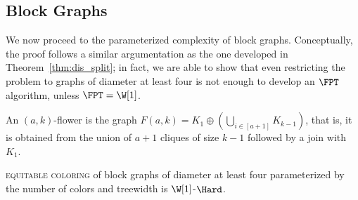 \subsection{Block Graphs}

We now proceed to the parameterized complexity of block graphs.
Conceptually, the proof follows a similar argumentation as the one developed in Theorem~\ref{thm:dis_split}; in fact, we are able to show that even restricting the problem to graphs of diameter at least four is not enough to develop an $\FPT$ algorithm, unless $\FPT = \W[1]$.
 
\begin{definition}
    An $(a,k)$-flower is the graph $F(a,k) = K_1 \oplus \left(\bigcup_{i \in [a+1]} K_{k-1}\right)$, that is, it is obtained from the union of $a+1$ cliques of size $k-1$ followed by a join with $K_1$.
\end{definition}

\begin{theorem}
    \label{thm:blocks}
    \textsc{equitable coloring} of block graphs of diameter at least four parameterized by the number of colors and treewidth is $\W[1]$-$\Hard$. 
\end{theorem}

